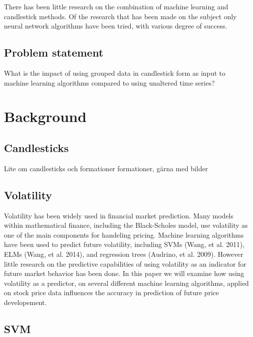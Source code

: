 \documentclass{article}
\begin{document}
There has been little research on the combination of machine learning and candlestick methods. Of the research that has been made on the subject only neural network algorithms have been tried, with various degree of success.

\subsection{Problem statement}
What is the impact of using grouped data in candlestick form as input to machine learning algorithms compared to using unaltered time series?


\section{Background}
\subsection{Candlesticks}
Lite om candlesticks och formationer formationer, g\"arna med bilder

\subsection{Volatility}
Volatility has been widely used in financial market prediction. Many models within mathematical finance, including the Black-Scholes model, use volatility as one of the main components for handeling pricing. Machine learning algorithms have been used to predict future volatility, including SVMs (Wang, et al. 2011), ELMs (Wang, et al. 2014), and regression trees (Audrino, et al. 2009).  However little research on the predictive capabilities of using volatility as an indicator for future market behavior has been done. In this paper we will examine how using volatility as a predictor, on several different machine learning algorithms, applied on stock price data influences the accuracy in prediction of future price developement. 
 
\subsection{SVM}
\end{document}
